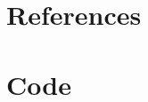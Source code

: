 \documentclass[pdftex,12pt,a4paper]{report}
\begin{document}
\deckblatt
\erklaerung



\tableofcontents








\appendix

\chapter{References}

\listoffigures

\begingroup
\let\clearpage\relax
\listoftables
\endgroup



\chapter{Code}
\end{document}
